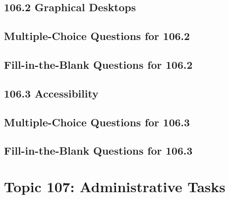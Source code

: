 \documentclass[a4paper]{report}
\begin{document}
\section*{106.2 Graphical Desktops}

\newpage
\section*{Multiple-Choice Questions for 106.2}

\newpage
\section*{Fill-in-the-Blank Questions for 106.2}

\newpage
\section*{106.3 Accessibility}

\newpage
\section*{Multiple-Choice Questions for 106.3}

\newpage
\section*{Fill-in-the-Blank Questions for 106.3}


\newpage
\chapter{Topic 107: Administrative Tasks}
\end{document}
